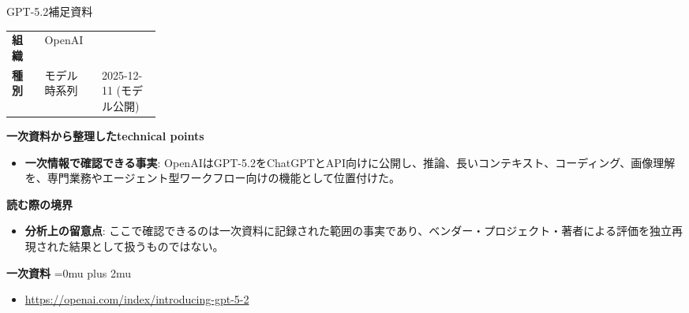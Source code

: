 \begin{technicalnote}{GPT-5.2}{補足資料}
\begingroup
\begin{tabularx}{\linewidth}{@{}>{\bfseries}p{0.22\linewidth}X@{}}
組織 & OpenAI \\
種別 & モデル
時系列 & 2025-12-11 (モデル公開) \\
\end{tabularx}
\smallskip
{\bfseries 一次資料から整理したtechnical points}
\begin{itemize}[leftmargin=1.5em,itemsep=0.35em]
\item \textbf{一次情報で確認できる事実}: OpenAIはGPT-5.2をChatGPTとAPI向けに公開し、推論、長いコンテキスト、コーディング、画像理解を、専門業務やエージェント型ワークフロー向けの機能として位置付けた。
\end{itemize}
\begin{minipage}{\linewidth}
{\bfseries 読む際の境界}
\begin{itemize}[leftmargin=1.5em,itemsep=0.35em]
\item \textbf{分析上の留意点}: ここで確認できるのは一次資料に記録された範囲の事実であり、ベンダー・プロジェクト・著者による評価を独立再現された結果として扱うものではない。
\end{itemize}
\begin{samepage}
{\bfseries 一次資料}
\begingroup\sloppy
\Urlmuskip=0mu plus 2mu\relax
\begin{itemize}[leftmargin=1.5em,itemsep=0.25em]
\item {\scriptsize\url{https://openai.com/index/introducing-gpt-5-2}}
\end{itemize}
\endgroup
\end{samepage}
\end{minipage}
\endgroup
\end{technicalnote}
\medskip


